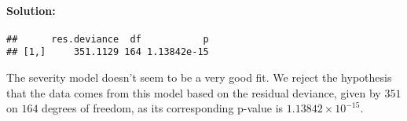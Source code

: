\documentclass[
]{article}
\newenvironment{Shaded}{\begin{snugshade}}{\end{snugshade}}
\newcommand{\AttributeTok}[1]{\textcolor[rgb]{0.77,0.63,0.00}{#1}}
\newcommand{\ConstantTok}[1]{\textcolor[rgb]{0.00,0.00,0.00}{#1}}
\newcommand{\DecValTok}[1]{\textcolor[rgb]{0.00,0.00,0.81}{#1}}
\newcommand{\FunctionTok}[1]{\textcolor[rgb]{0.00,0.00,0.00}{#1}}
\newcommand{\NormalTok}[1]{#1}
\newcommand{\OtherTok}[1]{\textcolor[rgb]{0.56,0.35,0.01}{#1}}
\newcommand{\SpecialCharTok}[1]{\textcolor[rgb]{0.00,0.00,0.00}{#1}}
\newcommand{\StringTok}[1]{\textcolor[rgb]{0.31,0.60,0.02}{#1}}
\begin{document}
\hypertarget{solution-3}{%
\paragraph{Solution:}\label{solution-3}}

\begin{Shaded}
\end{Shaded}

\begin{verbatim}
##      res.deviance  df           p
## [1,]     351.1129 164 1.13842e-15
\end{verbatim}

The severity model doesn't seem to be a very good fit. We reject the
hypothesis that the data comes from this model based on the residual
deviance, given by \(351\) on \(164\) degrees of freedom, as its
corresponding p-value is \(1.13842 \times 10^{-15}\).
\end{document}
